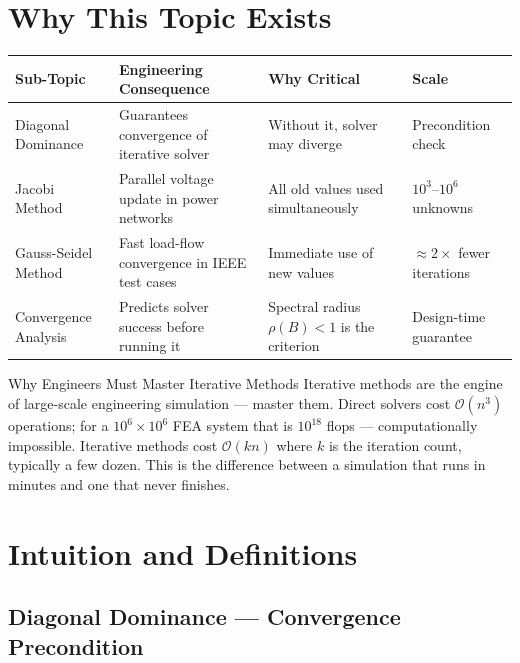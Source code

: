 \documentclass[12pt,a4paper]{article}
\begin{document}
\section{Why This Topic Exists}

\begin{center}
\begin{tabular}{@{}llll@{}}
\toprule
\textbf{Sub-Topic} & \textbf{Engineering Consequence} & \textbf{Why Critical} & \textbf{Scale} \\
\midrule
Diagonal Dominance &
  Guarantees convergence of iterative solver &
  Without it, solver may diverge &
  Precondition check \\
\addlinespace
Jacobi Method &
  Parallel voltage update in power networks &
  All old values used simultaneously &
  \(10^3\)--\(10^6\) unknowns \\
\addlinespace
Gauss-Seidel Method &
  Fast load-flow convergence in IEEE test cases &
  Immediate use of new values &
  \(\approx 2\times\) fewer iterations \\
\addlinespace
Convergence Analysis &
  Predicts solver success before running it &
  Spectral radius \(\rho(B)<1\) is the criterion &
  Design-time guarantee \\
\bottomrule
\end{tabular}
\end{center}

\begin{learnbox}{Why Engineers Must Master Iterative Methods}
Iterative methods are the engine of large-scale engineering simulation --- master them.
Direct solvers cost \(\mathcal{O}(n^3)\) operations; for a \(10^6 \times 10^6\) FEA system
that is \(10^{18}\) flops --- computationally impossible. Iterative methods cost
\(\mathcal{O}(kn)\) where \(k\) is the iteration count, typically a few dozen. This is
the difference between a simulation that runs in minutes and one that never finishes.
\end{learnbox}

\section{Intuition and Definitions}

\subsection{Diagonal Dominance --- Convergence Precondition}
\end{document}
